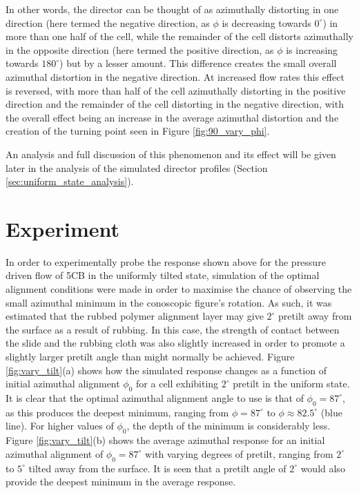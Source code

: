 In other words, the director can be thought of as azimuthally distorting in one direction (here termed the negative direction, as $\phi$ is decreasing towards $0^{\circ}$) in more than one half of the cell, while the remainder of the cell distorts azimuthally in the opposite direction (here termed the positive direction, as $\phi$ is increasing towards $180^{\circ}$) but by a lesser amount. This difference creates the small overall azimuthal distortion in the negative direction. At increased flow rates this effect is reversed, with more than half of the cell azimuthally distorting in the positive direction and the remainder of the cell distorting in the negative direction, with the overall effect being an increase in the average azimuthal distortion and the creation of the turning point seen in Figure \ref{fig:90_vary_phi}. 

An analysis and full discussion of this phenomenon and its effect will be given later in the analysis of the simulated director profiles (Section \ref{sec:uniform_state_analysis}).

\section{Experiment}
\label{sec:uniform_experiment}
In order to experimentally probe the response shown above for the pressure driven flow of 5CB in the uniformly tilted state, simulation of the optimal alignment conditions were made in order to maximise the chance of observing the small azimuthal minimum in the conoscopic figure's rotation. As such, it was estimated that the rubbed polymer alignment layer may give $2^{\circ}$ pretilt away from the surface as a result of rubbing. In this case, the strength of contact between the slide and the rubbing cloth was also slightly increased in order to promote a slightly larger pretilt angle than might normally be achieved. Figure \ref{fig:vary_tilt}(a) shows how the simulated response changes as a function of initial azimuthal alignment $\phi_0$ for a cell exhibiting $2^{\circ}$ pretilt in the uniform state. It is clear that the optimal azimuthal alignment angle to use is that of $\phi_0=87^{\circ}$, as this produces the deepest minimum, ranging from $\phi=87^{\circ}$ to $\phi\approx82.5^{\circ}$ (blue line). For higher values of $\phi_0$, the depth of the minimum is considerably less. Figure \ref{fig:vary_tilt}(b) shows the average azimuthal response for an initial azimuthal alignment of $\phi_0=87^{\circ}$ with varying degrees of pretilt, ranging from $2^{\circ}$ to $5^{\circ}$ tilted away from the surface. It is seen that a pretilt angle of $2^{\circ}$ would also provide the deepest minimum in the average response.

